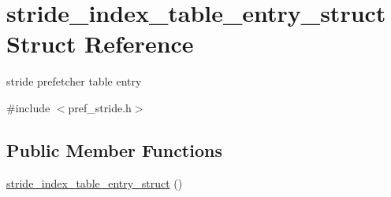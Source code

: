\hypertarget{structstride__index__table__entry__struct}{
\section{stride\_\-index\_\-table\_\-entry\_\-struct Struct Reference}
\label{structstride__index__table__entry__struct}
}


stride prefetcher table entry  




{\ttfamily \#include $<$pref\_\-stride.h$>$}

\subsection*{Public Member Functions}
\begin{DoxyCompactItemize}
\item 
\hyperlink{structstride__index__table__entry__struct_a95c01733c71212ddc1b18da945ab3e39}{stride\_\-index\_\-table\_\-entry\_\-struct} ()
\end{DoxyCompactItemize}
